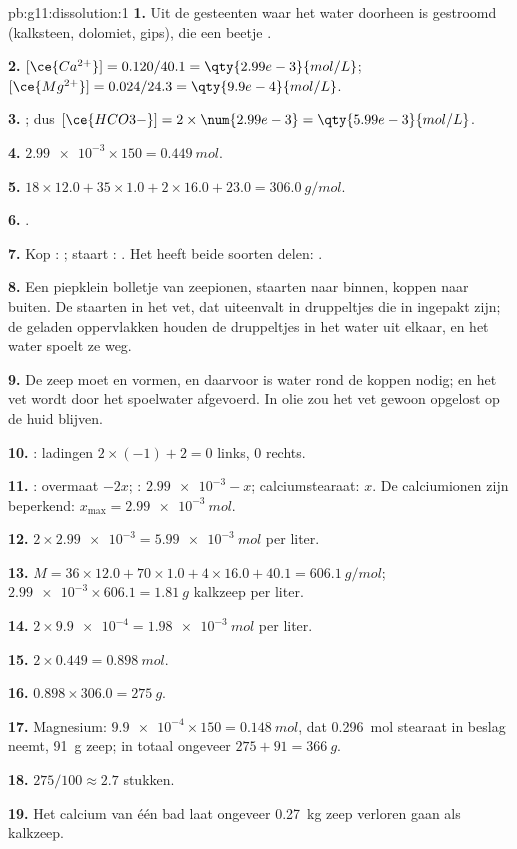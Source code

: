 \begin{solution}{pb:g11:dissolution:1}
\textbf{1.} Uit de gesteenten waar het water doorheen is gestroomd
(kalksteen, dolomiet, gips), die een beetje .

\textbf{2.} $[\ce{Ca^{2+}}] = 0.120 / 40.1 = \qty{2.99e-3}{mol/L}$;
$[\ce{Mg^{2+}}] = 0.024 / 24.3 = \qty{9.9e-4}{mol/L}$.

\textbf{3.} ; dus
$[\ce{HCO3-}] = 2 \times \num{2.99e-3} = \qty{5.99e-3}{mol/L}$.

\textbf{4.} $\num{2.99e-3} \times 150 = \qty{0.449}{mol}$.

\textbf{5.} $18 \times 12.0 + 35 \times 1.0 + 2 \times 16.0 + 23.0 =
\qty{306.0}{g/mol}$.

\textbf{6.} .

\textbf{7.} Kop : ; staart : .
Het heeft beide soorten delen: .

\textbf{8.} Een piepklein bolletje van zeepionen, staarten naar binnen,
koppen naar buiten. De staarten  in het vet, dat uiteenvalt in
druppeltjes die in  ingepakt zijn; de geladen oppervlakken houden
de druppeltjes in het water uit elkaar, en het water spoelt ze weg.

\textbf{9.} De zeep moet  en  vormen, en daarvoor is water
rond de koppen nodig; en het vet wordt door het spoelwater afgevoerd. In
olie zou het vet gewoon opgelost op de huid blijven.

\textbf{10.} : ladingen
$2 \times (-1) + 2 = 0$ links, $0$ rechts.

\textbf{11.} : overmaat $- 2x$; :
$\num{2.99e-3} - x$; calciumstearaat: $x$. De calciumionen zijn
beperkend: $x_{\max} = \qty{2.99e-3}{mol}$.

\textbf{12.} $2 \times \num{2.99e-3} = \qty{5.99e-3}{mol}$ per liter.

\textbf{13.} $M = 36 \times 12.0 + 70 \times 1.0 + 4 \times 16.0 + 40.1 =
\qty{606.1}{g/mol}$; $\num{2.99e-3} \times 606.1 = \qty{1.81}{g}$
kalkzeep per liter.

\textbf{14.} $2 \times \num{9.9e-4} = \qty{1.98e-3}{mol}$ per liter.

\textbf{15.} $2 \times 0.449 = \qty{0.898}{mol}$.

\textbf{16.} $0.898 \times 306.0 = \qty{275}{g}$.

\textbf{17.} Magnesium: $\num{9.9e-4} \times 150 = \qty{0.148}{mol}$, dat
\qty{0.296}{mol} stearaat in beslag neemt, \qty{91}{g} zeep; in totaal
ongeveer $275 + 91 = \qty{366}{g}$.

\textbf{18.} $275 / 100 \approx 2.7$ stukken.

\textbf{19.} Het calcium van één bad laat ongeveer \qty{0.27}{kg} zeep
verloren gaan als kalkzeep.
\end{solution}
